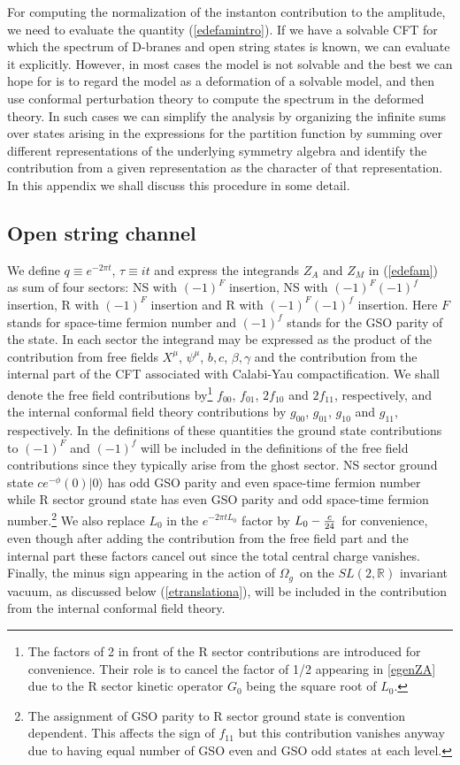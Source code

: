 \documentclass[12pt,a4paper]{article}
\newcommand{\refb}[1]{(\ref{#1})}
\newcommand{\IR}{\mathds{R}}
\newcommand{\oo}{{$\Omega_g$}}
\begin{document}
For computing the normalization of the instanton contribution to the amplitude,
we need to evaluate the quantity \refb{edefamintro}. If we have a solvable CFT for which
the spectrum of D-branes and open string states is known, we can evaluate it explicitly.
However, in most cases the model is not solvable and the best we can hope for
is to regard the model as a deformation of
a solvable model, and then use conformal perturbation theory to compute the spectrum in the
deformed theory. In such cases we can simplify the analysis by organizing the infinite sums over
states arising in the expressions for the partition function by summing over different representations
of the underlying symmetry algebra and identify the contribution from a given representation
as the character of that representation.
In this appendix we shall discuss this procedure in some detail.


\subsection{Open string channel}
\label{sE-open}


We define $q\equiv e^{-2\pi t}$, $\tau\equiv it$ and express the integrands $Z_A$ and $Z_M$ in
\refb{edefam} as sum of four sectors: NS with $(-1)^F$ insertion, NS with $(-1)^F(-1)^f$ insertion,
R with $(-1)^F$ insertion and R with $(-1)^F(-1)^f $ insertion. Here $F$ stands for space-time
fermion number and $(-1)^f$ stands for the GSO parity
of the state.
In each sector the integrand
may be expressed as the product of the contribution from free fields $X^\mu$, $\psi^\mu$,
$b,c$, $\beta,\gamma$ and the contribution from the internal part of the CFT associated
with Calabi-Yau compactification. We shall denote
the free field contributions by\footnote{The factors of 2 in front of the R sector contributions are introduced for convenience.
Their role is to cancel the factor of 1/2 appearing in \eqref{egenZA} due to the
R sector kinetic operator $G_0$ being the square root of $L_0$.}
$f_{00}$, $f_{01}$, $2f_{10}$ and $2f_{11}$, respectively, and the internal conformal field theory contributions by
$g_{00}$, $g_{01}$, $g_{10}$ and $g_{11}$, respectively. In the definitions of these quantities the
ground state contributions to $(-1)^F$ and $(-1)^f$ will be included in the definitions of
the free field contributions since they typically arise from the ghost sector.
NS sector ground state $c e^{-\phi}(0)|0\rangle$ has odd GSO parity and even space-time
fermion number while R sector ground state has even GSO parity and odd space-time
fermion number.\footnote{The assignment of GSO parity to R sector ground state is
convention dependent. This affects the sign of $f_{11}$
but this contribution vanishes anyway due to having equal number
of GSO even and GSO odd states at each level.}
We also replace $L_0$ in the $e^{-2\pi t L_0}$ factor by $L_0-{c\over 24}$ for convenience, even though after adding
the contribution from the free field part and the internal part these factors cancel out
since the total central charge vanishes. Finally, the minus sign appearing in the action of
\oo\ on the $SL(2,\IR)$ invariant vacuum, as discussed below \refb{etranslationa},
will be included in the contribution from the internal conformal field theory.
\end{document}
